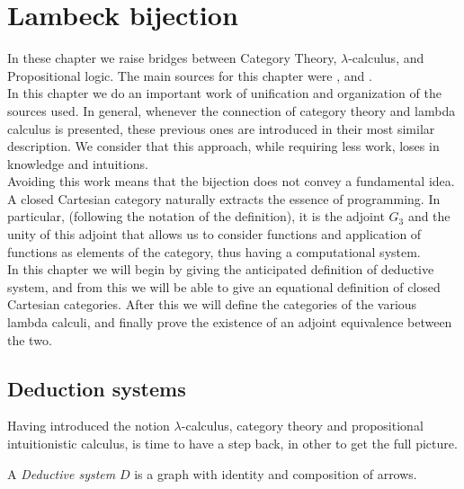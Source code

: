 
\chapter{Lambeck bijection}
\label{chap:4}
\thispagestyle{empty}
In these chapter we raise bridges between Category Theory, $\lambda$-calculus, and Propositional logic. The main sources for this chapter were  \cite{lambek1988introduction}, \cite{lambek1985cartesian} and \cite[Chapter 6]{selinger2008lecture}.\\

In this chapter we do an important work of unification and organization of the sources used. In general, whenever the connection of category theory and lambda calculus is presented, these previous ones are introduced in their most similar description. We consider that this approach, while requiring less work, loses in knowledge and intuitions.\\


 Avoiding this work means that the bijection does not convey a fundamental idea. A closed Cartesian category naturally extracts the essence of programming. In particular, (following the notation of the definition), it is the adjoint $G_3$ and the unity of this adjoint that allows us to consider functions and application of functions as elements of the category, thus having a computational system.\\

In this chapter we will begin by giving the anticipated definition of deductive system, and from this we will be able to give an equational definition of closed Cartesian categories.  After this we will define the categories of the various lambda calculi, and finally prove the existence of an adjoint equivalence between the two.\\



\section{Deduction systems}
Having introduced the notion $\lambda$-calculus, category theory and propositional intuitionistic calculus, is time to have a step back, in other to get the full picture.

\begin{definition}
  A \emph{Deductive system} $D$ is a graph  with identity and composition of arrows.
\end{definition}

